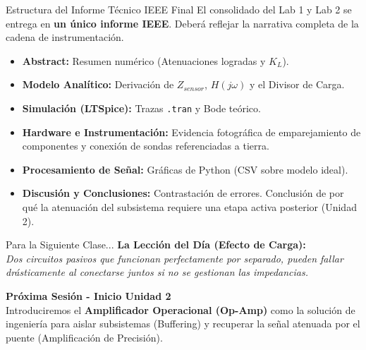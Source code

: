\documentclass[aspectratio=169, 10pt]{beamer}
\begin{document}
\begin{frame}{Estructura del Informe Técnico IEEE Final}
    El consolidado del Lab 1 y Lab 2 se entrega en \textbf{un único informe IEEE}. Deberá reflejar la narrativa completa de la cadena de instrumentación.
    
    \vspace{0.3cm}
    \begin{itemize}
        \setlength{\itemsep}{4pt}
        \item \textbf{Abstract:} Resumen numérico (Atenuaciones logradas y $K_L$).
        \item \textbf{Modelo Analítico:} Derivación de $Z_{sensor}$, $H(j\omega)$ y el Divisor de Carga.
        \item \textbf{Simulación (LTSpice):} Trazas \texttt{.tran} y Bode teórico.
        \item \textbf{Hardware e Instrumentación:} Evidencia fotográfica de emparejamiento de componentes y conexión de sondas referenciadas a tierra.
        \item \textbf{Procesamiento de Señal:} Gráficas de Python (CSV sobre modelo ideal).
        \item \textbf{Discusión y Conclusiones:} Contrastación de errores. Conclusión de por qué la atenuación del subsistema requiere una etapa activa posterior (Unidad 2).
    \end{itemize}
\end{frame}

\begin{frame}{Para la Siguiente Clase...}
    \textbf{La Lección del Día (Efecto de Carga):}\\
    \textit{Dos circuitos pasivos que funcionan perfectamente por separado, pueden fallar drásticamente al conectarse juntos si no se gestionan las impedancias.}
    
    \vspace{0.8cm}
    \textbf{Próxima Sesión - Inicio Unidad 2}\\
    Introduciremos el \textbf{Amplificador Operacional (Op-Amp)} como la solución de ingeniería para aislar subsistemas (Buffering) y recuperar la señal atenuada por el puente (Amplificación de Precisión).
\end{frame}
\end{document}

